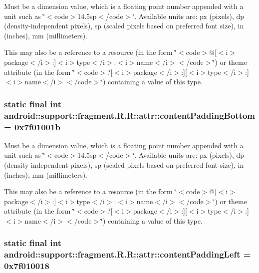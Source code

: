 Must be a dimension value, which is a floating point number appended with a unit such as \char`\"{}$<$code$>$14.5sp$<$/code$>$\char`\"{}. Available units are: px (pixels), dp (density-independent pixels), sp (scaled pixels based on preferred font size), in (inches), mm (millimeters). 

This may also be a reference to a resource (in the form \char`\"{}$<$code$>$@\mbox{[}$<$i$>$package$<$/i$>$:\mbox{]}$<$i$>$type$<$/i$>$:$<$i$>$name$<$/i$>$$<$/code$>$\char`\"{}) or theme attribute (in the form \char`\"{}$<$code$>$?\mbox{[}$<$i$>$package$<$/i$>$:\mbox{]}\mbox{[}$<$i$>$type$<$/i$>$:\mbox{]}$<$i$>$name$<$/i$>$$<$/code$>$\char`\"{}) containing a value of this type. \hypertarget{classandroid_1_1support_1_1fragment_1_1_r_1_1attr_6e0253fcef2242ee6f224b056125c1e4}{
\subsubsection[{contentPaddingBottom}]{\setlength{\rightskip}{0pt plus 5cm}static final int android::support::fragment.R.R::attr::contentPaddingBottom = 0x7f01001b}}
\label{classandroid_1_1support_1_1fragment_1_1_r_1_1attr_6e0253fcef2242ee6f224b056125c1e4}


Must be a dimension value, which is a floating point number appended with a unit such as \char`\"{}$<$code$>$14.5sp$<$/code$>$\char`\"{}. Available units are: px (pixels), dp (density-independent pixels), sp (scaled pixels based on preferred font size), in (inches), mm (millimeters). 

This may also be a reference to a resource (in the form \char`\"{}$<$code$>$@\mbox{[}$<$i$>$package$<$/i$>$:\mbox{]}$<$i$>$type$<$/i$>$:$<$i$>$name$<$/i$>$$<$/code$>$\char`\"{}) or theme attribute (in the form \char`\"{}$<$code$>$?\mbox{[}$<$i$>$package$<$/i$>$:\mbox{]}\mbox{[}$<$i$>$type$<$/i$>$:\mbox{]}$<$i$>$name$<$/i$>$$<$/code$>$\char`\"{}) containing a value of this type. \hypertarget{classandroid_1_1support_1_1fragment_1_1_r_1_1attr_ef15f3e994f02df4d230ac5fcf5604a4}{
\subsubsection[{contentPaddingLeft}]{\setlength{\rightskip}{0pt plus 5cm}static final int android::support::fragment.R.R::attr::contentPaddingLeft = 0x7f010018}}
\label{classandroid_1_1support_1_1fragment_1_1_r_1_1attr_ef15f3e994f02df4d230ac5fcf5604a4}


